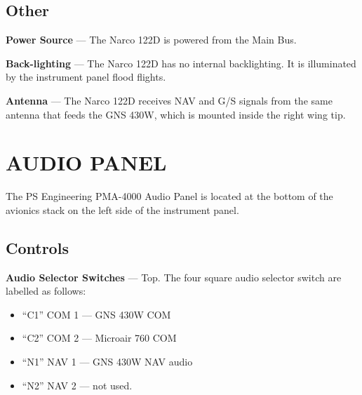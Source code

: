 \subsection*{Other}

\textbf{Power Source} --- The Narco 122D is powered from the Main Bus. 

\textbf{Back-lighting} --- The Narco 122D has no internal backlighting.  It is illuminated by the instrument panel flood flights.

\textbf{Antenna} --- The Narco 122D receives NAV and G/S signals from the same antenna that feeds the GNS 430W, which is mounted inside the right wing tip.

{}
\section{AUDIO PANEL} 

The PS Engineering PMA-4000 Audio Panel is located at the bottom of the avionics stack on the left side of the instrument panel.

\subsection*{Controls}

\textbf{Audio Selector Switches} --- Top. The four square audio selector switch are labelled as follows: 
\begin{itemize}
\item ``C1'' COM 1 --- GNS 430W COM 
\item ``C2'' COM 2 --- Microair 760 COM 
\item ``N1'' NAV 1 --- GNS 430W NAV audio 
\item ``N2'' NAV 2 --- not used. 
\end{itemize}


